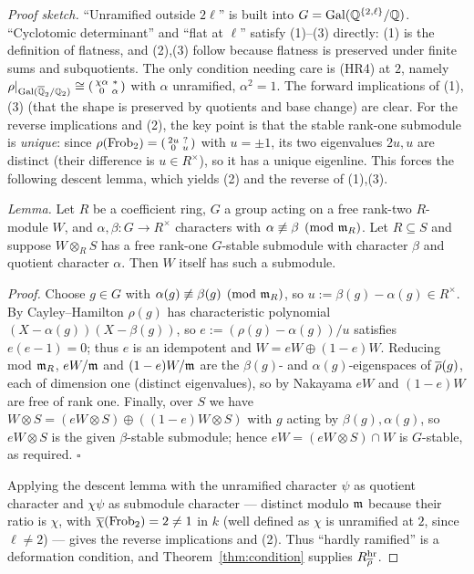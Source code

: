 \documentclass[11pt]{article}
\begin{document}
\begin{proof}[Proof sketch]
``Unramified outside $2\ell$'' is built into $G=\operatorname{Gal}(\mathbb{Q}^{\{2,\ell\}}/\mathbb{Q})$.
``Cyclotomic determinant'' and ``flat at $\ell$'' satisfy (1)--(3) directly: (1)
is the definition of flatness, and (2),(3) follow because flatness is preserved
under finite sums and subquotients. The only condition needing care is (HR4) at
$2$, namely $\rho|_{\operatorname{Gal}(\overline{\mathbb{Q}}_2/\mathbb{Q}_2)}\cong\left(\begin{smallmatrix}\chi\alpha&*\\0&\alpha\end{smallmatrix}\right)$
with $\alpha$ unramified, $\alpha^2=1$. The forward implications of (1),(3) (that
the shape is preserved by quotients and base change) are clear. For the reverse
implications and (2), the key point is that the stable rank-one submodule is
\emph{unique}: since $\rho(\operatorname{Frob}_2)=\left(\begin{smallmatrix}2u&?\\0&u\end{smallmatrix}\right)$
with $u=\pm1$, its two eigenvalues $2u,u$ are distinct (their difference is
$u\in R^\times$), so it has a unique eigenline. This forces the following
descent lemma, which yields (2) and the reverse of (1),(3).

\emph{Lemma.} Let $R$ be a coefficient ring, $G$ a group acting on a free
rank-two $R$-module $W$, and $\alpha,\beta\colon G\to R^\times$ characters with
$\alpha\not\equiv\beta\pmod{\mathfrak{m}_R}$. Let $R\subseteq S$ and suppose $W\otimes_RS$
has a free rank-one $G$-stable submodule with character $\beta$ and quotient
character $\alpha$. Then $W$ itself has such a submodule.

\emph{Proof.} Choose $g\in G$ with $\alpha(g)\not\equiv\beta(g)\pmod{\mathfrak{m}_R}$, so
$u:=\beta(g)-\alpha(g)\in R^\times$. By Cayley--Hamilton
$\rho(g)$ has characteristic polynomial $(X-\alpha(g))(X-\beta(g))$, so
$e:=(\rho(g)-\alpha(g))/u$ satisfies $e(e-1)=0$; thus $e$ is an idempotent and
$W=eW\oplus(1-e)W$. Reducing mod $\mathfrak{m}_R$, $eW/\mathfrak{m}$ and $(1-e)W/\mathfrak{m}$ are the
$\beta(g)$- and $\alpha(g)$-eigenspaces of $\overline{\rho}(g)$, each of dimension one
(distinct eigenvalues), so by Nakayama $eW$ and $(1-e)W$ are free of rank one.
Finally, over $S$ we have $W\otimes S=(eW\otimes S)\oplus((1-e)W\otimes S)$ with
$g$ acting by $\beta(g),\alpha(g)$, so $eW\otimes S$ is the given $\beta$-stable
submodule; hence $eW=(eW\otimes S)\cap W$ is $G$-stable, as required. $\square$

Applying the descent lemma with the unramified character $\psi$ as quotient
character and $\chi\psi$ as submodule character --- distinct modulo $\mathfrak{m}$ because
their ratio is $\chi$, with $\overline{\chi}(\operatorname{Frob}_2)=2\neq1$ in $k$ (well defined as
$\chi$ is unramified at $2$, since $\ell\neq2$) --- gives the reverse
implications and (2). Thus ``hardly ramified'' is a deformation condition, and
Theorem~\ref{thm:condition} supplies $R^{\mathrm{hr}}_{\overline{\rho}}$.
\end{proof}
\end{document}

